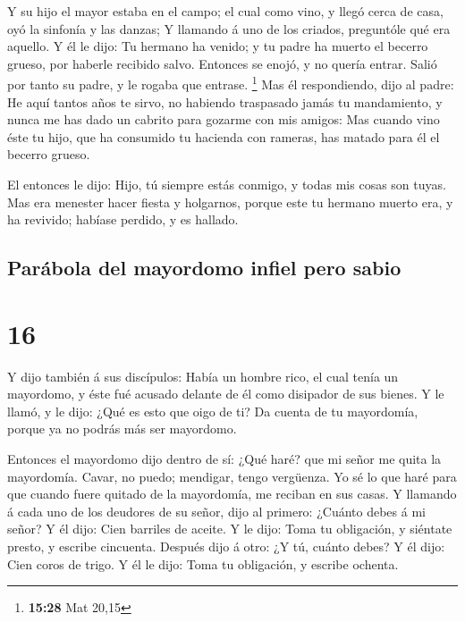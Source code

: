  Y su hijo el mayor estaba en el campo; el cual como vino,
y llegó cerca de casa, oyó la sinfonía y las danzas;  Y
llamando á uno de los criados, preguntóle qué era aquello. 
Y él le dijo: Tu hermano ha venido; y tu padre ha muerto el becerro
grueso, por haberle recibido salvo.  Entonces se enojó, y
no quería entrar. Salió por tanto su padre, y le rogaba que entrase.
\footnote{\textbf{15:28} Mat 20,15}  Mas él respondiendo,
dijo al padre: He aquí tantos años te sirvo, no habiendo traspasado
jamás tu mandamiento, y nunca me has dado un cabrito para gozarme con
mis amigos:  Mas cuando vino éste tu hijo, que ha consumido
tu hacienda con rameras, has matado para él el becerro grueso.

 El entonces le dijo: Hijo, tú siempre estás conmigo, y
todas mis cosas son tuyas.  Mas era menester hacer fiesta y
holgarnos, porque este tu hermano muerto era, y ha revivido; habíase
perdido, y es hallado.

\hypertarget{paruxe1bola-del-mayordomo-infiel-pero-sabio}{%
\subsection{Parábola del mayordomo infiel pero
sabio}\label{paruxe1bola-del-mayordomo-infiel-pero-sabio}}

\hypertarget{section-15}{%
\section{16}\label{section-15}}

 Y dijo también á sus discípulos: Había un hombre rico, el
cual tenía un mayordomo, y éste fué acusado delante de él como disipador
de sus bienes.  Y le llamó, y le dijo: ¿Qué es esto que oigo
de ti? Da cuenta de tu mayordomía, porque ya no podrás más ser
mayordomo.

 Entonces el mayordomo dijo dentro de sí: ¿Qué haré? que mi
señor me quita la mayordomía. Cavar, no puedo; mendigar, tengo
vergüenza.  Yo sé lo que haré para que cuando fuere quitado
de la mayordomía, me reciban en sus casas.  Y llamando á
cada uno de los deudores de su señor, dijo al primero: ¿Cuánto debes á
mi señor?  Y él dijo: Cien barriles de aceite. Y le dijo:
Toma tu obligación, y siéntate presto, y escribe cincuenta. 
Después dijo á otro: ¿Y tú, cuánto debes? Y él dijo: Cien coros de
trigo. Y él le dijo: Toma tu obligación, y escribe ochenta.

